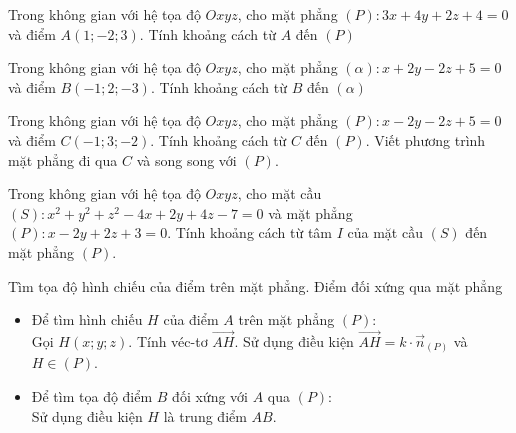 \begin{bt}%
	Trong không gian với hệ tọa độ $Oxyz$, cho mặt phẳng $(P): 3x+4y+2z+4=0$ và điểm $A(1;-2;3)$. Tính khoảng cách từ $A$ đến $(P)$
\end{bt}
\begin{bt}%
	Trong không gian với hệ tọa độ $Oxyz$, cho mặt phẳng $(\alpha): x+2y-2z+5=0$ và điểm $B(-1;2;-3)$. Tính khoảng cách từ $B$ đến $(\alpha)$
\end{bt}
\begin{bt}%
	[ĐH-2013NC-Khối D] Trong không gian với hệ tọa độ $Oxyz$, cho mặt phẳng $(P): x-2y-2z+5=0$ và điểm $C(-1;3;-2)$. Tính khoảng cách từ $C$ đến $(P)$. Viết phương trình mặt phẳng đi qua $C$ và song song với $(P)$.
\end{bt}
\begin{bt}%
	Trong không gian với hệ tọa độ $Oxyz$, cho mặt cầu $(S):x^2+y^2+z^2-4x+2y+4z-7=0$ và mặt phẳng $(P):x-2y+2z+3=0$. Tính khoảng cách từ tâm $I$ của mặt cầu $(S)$ đến mặt phẳng $(P)$.
\end{bt}
\begin{dang}{Tìm tọa độ hình chiếu của điểm trên mặt phẳng. Điểm đối xứng qua mặt phẳng}
	\begin{itemize}
		\item Để tìm hình chiếu $H$ của điểm $A$ trên mặt phẳng $(P)$:\\
		Gọi $H(x;y;z)$. Tính véc-tơ $\overrightarrow{AH}$. Sử dụng điều kiện $\overrightarrow{AH}=k\cdot \vec{n}_{(P)}$ và $H\in (P)$.
		\item Để tìm tọa độ điểm $B$ đối xứng với $A$ qua $(P)$:\\
		Sử dụng điều kiện $H$ là trung điểm $AB$.
	\end{itemize}
\end{dang}


